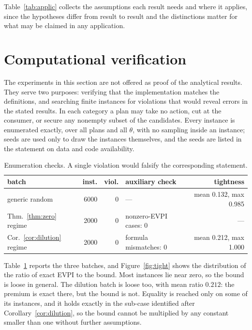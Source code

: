 \documentclass[pdflatex,sn-mathphys-num]{sn-jnl}
\theoremstyle{thmstyleone}
\theoremstyle{thmstyletwo}
\theoremstyle{thmstylethree}
\begin{document}
Table~\ref{tab:applic} collects the assumptions each result needs and where
it applies, since the hypotheses differ from result to result and the
distinctions matter for what may be claimed in any application.

\section{Computational verification}\label{sec:verify}

The experiments in this section are not offered as proof of the analytical
results. They serve two purposes: verifying that the implementation matches
the definitions, and searching finite instances for violations that would
reveal errors in the stated results. In each category a plan may take no
action, cut at the consumer, or secure any nonempty subset of the
candidates. Every instance is enumerated exactly, over all plans and all $\theta$, with no
sampling inside an instance; seeds are used only to draw the instances
themselves, and the seeds are listed in the statement on data and code
availability.

\begin{table}[ht]
\caption{Enumeration checks. A single violation would falsify the
corresponding statement.}\label{tab:verify}
\small
\begin{tabular}{@{}lrrlr@{}}
\toprule
batch & inst. & viol. & auxiliary check & tightness \\
\midrule
generic random & 6000 & 0 & --- & mean 0.132, max 0.985 \\
Thm.~\ref{thm:zero} regime & 2000 & 0 & nonzero-EVPI cases: 0 & --- \\
Cor.~\ref{cor:dilution} regime & 2000 & 0 & formula mismatches: 0 & mean 0.212, max 1.000 \\
\bottomrule
\end{tabular}
\end{table}

Table~\ref{tab:verify} reports the three batches, and Figure~\ref{fig:tight}
shows the distribution of the ratio of exact EVPI to the bound. Most instances lie near zero, so the bound is loose in general.
The dilution batch is loose too, with mean ratio $0.212$: the premium is
exact there, but the bound is not. Equality is reached only on some of its
instances, and it holds exactly in the sub-case identified after
Corollary~\ref{cor:dilution}, so the bound cannot be multiplied by any
constant smaller than one without further assumptions.
\end{document}
